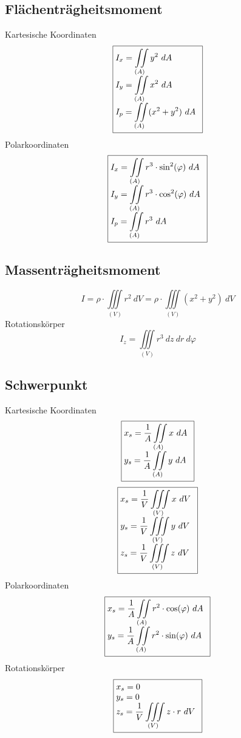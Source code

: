 \subsection{Flächenträgheitsmoment}
Kartesische Koordinaten
\[ \boxed{\begin{array}{@{}l}
\displaystyle I_x = \iint\limits_{(A)} y^2 ~ dA \\
\displaystyle I_y = \iint\limits_{(A)} x^2 ~ dA \\
\displaystyle I_p = \iint\limits_{(A)} (x^2 + y^2) ~ dA \\
\end{array}} \]
Polarkoordinaten
\[ \boxed{\begin{array}{@{}l}
\displaystyle I_x = \iint\limits_{(A)} r^3 \cdot \sin^2(\varphi) ~ dA \\
\displaystyle I_y = \iint\limits_{(A)} r^3 \cdot \cos^2(\varphi) ~ dA \\
\displaystyle I_p = \iint\limits_{(A)} r^3 ~ dA \\
\end{array}} \]

\subsection{Massenträgheitsmoment}
\[ \boxed{I = \rho \cdot \iiint\limits_{(V)} r^2 ~ dV 
= \rho \cdot \iiint\limits_{(V)} (x^2 + y^2) ~ dV} \]
Rotationskörper
\[ \boxed{I_z = \iiint\limits_{(V)} r^3 ~ dz ~ dr ~ d\varphi} \]

\subsection{Schwerpunkt}
Kartesische Koordinaten
\[ \boxed{\begin{array}{@{}l}
\displaystyle x_s = \frac{1}{A} \iint\limits_{(A)} x ~ dA \\
\displaystyle y_s = \frac{1}{A} \iint\limits_{(A)} y ~ dA \\
\end{array}} \]
\[ \boxed{\begin{array}{@{}l}
\displaystyle x_s = \frac{1}{V} \iiint\limits_{(V)} x ~ dV \\
\displaystyle y_s = \frac{1}{V} \iiint\limits_{(V)} y ~ dV \\
\displaystyle z_s = \frac{1}{V} \iiint\limits_{(V)} z ~ dV \\
\end{array}} \]
Polarkoordinaten
\[ \boxed{\begin{array}{@{}l}
\displaystyle x_s 
= \frac{1}{A} \iint\limits_{(A)} r^2 \cdot \cos(\varphi) ~ dA \\
\displaystyle y_s 
= \frac{1}{A} \iint\limits_{(A)} r^2 \cdot \sin(\varphi) ~ dA \\
\end{array}} \]
Rotationskörper
\[ \boxed{\begin{array}{@{}l}
\displaystyle x_s = 0 \\
\displaystyle y_s = 0 \\
\displaystyle z_s = \frac{1}{V} \iiint\limits_{(V)} z \cdot r ~ dV \\
\end{array}} \]

